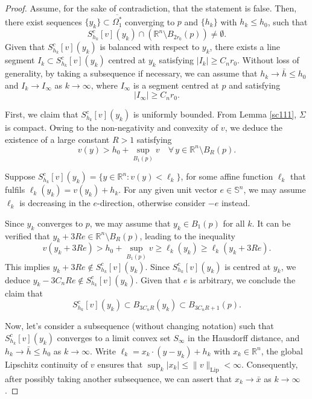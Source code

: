 \documentclass[10pt,a4paper]{amsart}
\theoremstyle{plain}
\newcommand{\0}{\textbf{0}}
\numberwithin{equation}{section}
\numberwithin{equation}{section}
\numberwithin{figure}{section}
\begin{document}
\begin{proof}
Assume, for the sake of contradiction, that the statement is false. Then, there exist sequences \( \{y_k\} \subset \overline{\Omega^{*}_1} \) converging to \( p \) and \( \{h_k\} \) with \( h_k \leq h_0 \), such that 
\begin{equation}\label{cseg1}
S_{h_k}^c[v](y_k) \cap \left(\mathbb{R}^n \setminus B_{2r_0}(p)\right) \neq \emptyset.
\end{equation}
Given that \( S_{h_k}^c[v](y_k) \) is balanced with respect to \( y_k \), there exists a line segment \( I_k \subset S_{h_k}^c[v](y_k) \) centred at \( y_k \) satisfying \( |I_k| \geq C_n r_0 \).
Without loss of generality, by taking a subsequence if necessary, we can assume that \( h_k \to \bar{h} \leq h_0 \) and \( I_k \to I_\infty \) as \( k \to \infty \), where \( I_\infty \) is a segment centred at \( p \) and satisfying
\begin{equation}\label{cseg2}
|I_\infty| \geq C_n r_0.
\end{equation}

First, we claim that $S_{h_k}^c[v](y_k)$ is uniformly bounded. 
From Lemma \ref{sc111}, $\Sigma$ is compact. 
Owing to the non-negativity and convexity of $v$, we deduce the existence of a large constant \( R > 1 \) satisfying
\[ v(y) > h_0 + \sup_{B_1(p)} v \quad \forall\, y \in \mathbb{R}^n \setminus B_R(p). \]

Suppose \( S_{h_k}^c[v](y_k) = \{y \in \mathbb{R}^n : v(y) < \ell_k\} \), for some affine function \( \ell_k \)  that fulfils \( \ell_k(y_k) = v(y_k) + h_k \). For any given unit vector \( e \in \mathbb{S}^n \), we may assume $\ell_k$ is decreasing in the $e$-direction, otherwise consider $-e$ instead.

Since \( y_k \) converges to \( p\), we may assume that \(y_k\in B_1(p) \) for all $k.$
It can be verified that \( y_k + 3Re \in \mathbb{R}^n \setminus B_R(p) \), leading to the inequality
\[ v(y_k + 3Re) > h_0 + \sup_{B_1(p)} v \geq \ell_k(y_k)\geq \ell_k(y_k+3Re). \]
This implies \( y_k + 3Re \notin S_{h_k}^c[v](y_k) \). 
Since \( S_{h_k}^c[v](y_k) \) is centred at \( y_k \), we deduce \( y_k - 3C_nRe \notin S_{h_k}^c[v](y_k) \). Given that \( e \) is arbitrary, we conclude the claim that 
\begin{equation} 
	S_{h_k}^c[v](y_k) \subset B_{3C_nR}(y_k) \subset B_{3C_nR+1}(p).
\end{equation}

Now, let's consider a subsequence (without changing notation) such that \( S_{h_k}^c[v](y_k) \) converges to a limit convex set \( S_\infty \) in the Hausdorff distance, and $h_k\to\bar h\leq h_0$ as $k\to\infty$. 
Write \( \ell_k = x_k \cdot (y - y_k) + h_k \) with \( x_k \in \mathbb{R}^n \), the global Lipschitz continuity of \( v \) ensures that \( \sup_k |x_k| \leq \|v\|_{\text{Lip}} < \infty \). Consequently, after possibly taking another subsequence, we can assert that \( x_k \to \bar{x} \) as \( k \to \infty \).



\end{proof}
\end{document}
